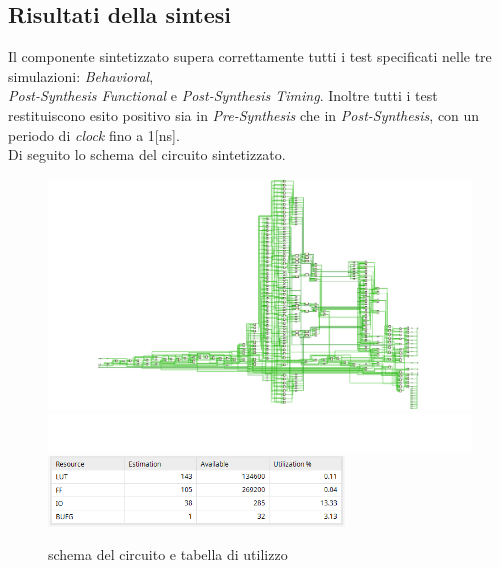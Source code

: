 \documentclass{article}
\begin{document}
\subsection{Risultati della sintesi}
Il componente sintetizzato supera correttamente tutti i test specificati nelle tre simulazioni: \textit{Behavioral}, \\\textit{Post-Synthesis Functional} e \textit{Post-Synthesis Timing}. Inoltre tutti i test restituiscono esito positivo sia in \textit{Pre-Synthesis} che in \textit{Post-Synthesis}, con un periodo di \textit{clock} fino a 1[ns].\\ Di seguito lo schema del circuito sintetizzato.
\begin{figure}[h]
    \centering
    \includegraphics[width=1\textwidth]{schema}
    \includegraphics[width=1\textwidth]{spazio}
    \includegraphics[width=0.7\textwidth]{utilizzo}
    \caption{schema del circuito e tabella di utilizzo}
\end{figure}
\end{document}
